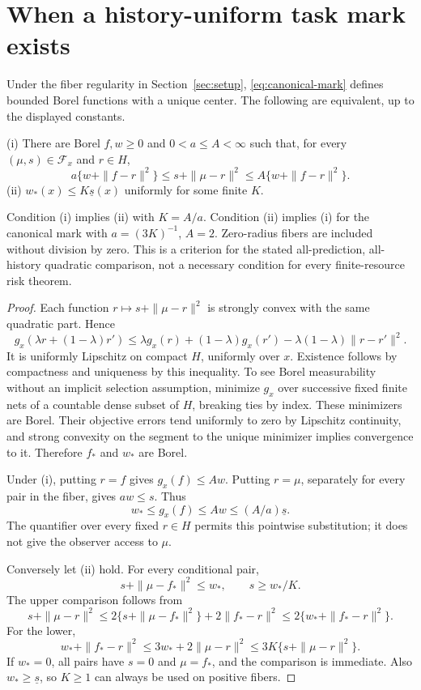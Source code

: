 \section{When a history-uniform task mark exists}
\label{sec:fiber}
\begin{theorem}\label{thm:fiber}
Under the fiber regularity in Section~\ref{sec:setup}, \eqref{eq:canonical-mark} defines bounded Borel functions with a unique center. The following are equivalent, up to the displayed constants.

\smallskip\noindent
(i) There are Borel $f,w\ge0$ and $0<a\le A<\infty$ such that, for every $(\mu,s)\in\mathcal F_x$ and $r\in H$,
\[
 a\{w+\|f-r\|^2\}\le s+\|\mu-r\|^2
       \le A\{w+\|f-r\|^2\}.
\]
\noindent
(ii) $w_*(x)\le K\underline s(x)$ uniformly for some finite $K$.

Condition (i) implies (ii) with $K=A/a$. Condition (ii) implies (i) for the canonical mark with $a=(3K)^{-1}$, $A=2$. Zero-radius fibers are included without division by zero. This is a criterion for the stated all-prediction, all-history quadratic comparison, not a necessary condition for every finite-resource risk theorem.
\end{theorem}
\begin{proof}
Each function $r\mapsto s+\|\mu-r\|^2$ is strongly convex with the same quadratic part. Hence
\[
 g_x(\lambda r+(1-\lambda)r')
 \le\lambda g_x(r)+(1-\lambda)g_x(r')
       -\lambda(1-\lambda)\|r-r'\|^2.
\]
It is uniformly Lipschitz on compact $H$, uniformly over $x$. Existence follows by compactness and uniqueness by this inequality. To see Borel measurability without an implicit selection assumption, minimize $g_x$ over successive fixed finite nets of a countable dense subset of $H$, breaking ties by index. These minimizers are Borel. Their objective errors tend uniformly to zero by Lipschitz continuity, and strong convexity on the segment to the unique minimizer implies convergence to it. Therefore $f_*$ and $w_*$ are Borel.

Under (i), putting $r=f$ gives $g_x(f)\le A w$. Putting $r=\mu$, separately for every pair in the fiber, gives $aw\le s$. Thus
\[
 w_*\le g_x(f)\le Aw\le(A/a)\underline s.
\]
The quantifier over every fixed $r\in H$ permits this pointwise substitution; it does not give the observer access to $\mu$.

Conversely let (ii) hold. For every conditional pair,
\[
 s+\|\mu-f_*\|^2\le w_*,\qquad s\ge w_*/K.
\]
The upper comparison follows from
\[
 s+\|\mu-r\|^2
 \le2\{s+\|\mu-f_*\|^2\}+2\|f_*-r\|^2
 \le2\{w_*+\|f_*-r\|^2\}.
\]
For the lower,
\[
 w_*+\|f_*-r\|^2
 \le3w_*+2\|\mu-r\|^2
 \le3K\{s+\|\mu-r\|^2\}.
\]
If $w_*=0$, all pairs have $s=0$ and $\mu=f_*$, and the comparison is immediate. Also $w_*\ge\underline s$, so $K\ge1$ can always be used on positive fibers.
\end{proof}


